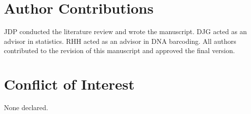 \section*{Author Contributions}

JDP conducted the literature review and wrote the manuscript. DJG acted as an advisor in statistics. RHH acted as an advisor in DNA barcoding. All authors contributed to the revision of this manuscript and approved the final version. 



\section*{Conflict of Interest}

None declared.
